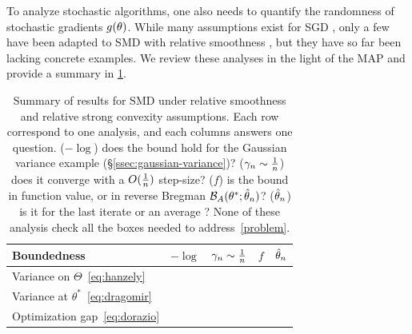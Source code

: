 To analyze stochastic algorithms, one also needs to quantify the randomness of stochastic gradients $g(\theta)$.
While many assumptions exist for SGD \citep[\S3 for a modern review]{khaled2020better}, only a few have been adapted to SMD with relative smoothness \citep{hanzely2018fastest, dragomir2021fast, dorazio2021stochastic}, but they have so far been lacking concrete examples.
We review these analyses in the light of the MAP and provide a summary in \cref{tbl:assumptions}.

\begin{table}[t]
	\caption{\vspace{-4ex} Summary of results for SMD
		under relative smoothness and relative strong convexity assumptions.
		Each row correspond to one analysis, and each columns answers one question.
		($-\log$) does the bound hold for the Gaussian variance example (\S\ref{ssec:gaussian-variance})?
		($\gamma_n \sim \frac{1}{n}$) does it converge with a $O(\frac{1}{n})$ step-size?
		($f$) is the bound in function value, or in reverse Bregman ${\mathcal B}_A(\theta^* ; \hat{\theta}_n)$?
		($\hat{\theta}_n$) is it for the last iterate or an average ?
		None of these analysis check all the boxes needed to address~\eqref{problem}. \vspace{-4ex}
	}
	\begin{center}
		\begin{tabular}{lcccc}
			\toprule
			Boundedness & $-\log$ &  $\gamma_n \sim \frac{1}{n}$ & $f$ & $\hat{\theta}_n$ \\
			\midrule
			Variance on $\Theta$~\eqref{eq:hanzely} %
			& \redxmark & \greencmark & \greencmark  & \redxmark
			\\
			Variance at $\theta^*$~\eqref{eq:dragomir} %
			& \redxmark & \greencmark & \redxmark  & \greencmark
			\\
			Optimization gap~\eqref{eq:dorazio} %
			& \greencmark & \redxmark & \redxmark & \greencmark
			\\
			\bottomrule
		\end{tabular}
	\end{center}
	\label{tbl:assumptions}
\end{table}


